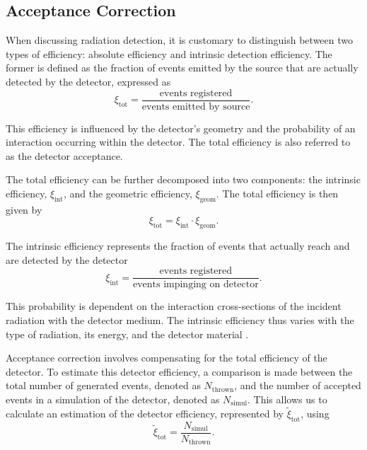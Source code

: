 \subsection{Acceptance Correction}
\label{ssec::acceptance_correction}
    When discussing radiation detection, it is customary to distinguish between two types of efficiency: absolute efficiency and intrinsic detection efficiency.
    The former is defined as the fraction of events emitted by the source that are actually detected by the detector, expressed as
    \begin{equation*}
        \xi_\text{tot} = \frac{\text{events registered}}{\text{events emitted by source}}.
    \end{equation*}

    This efficiency is influenced by the detector's geometry and the probability of an interaction occurring within the detector.
    The total efficiency is also referred to as the detector acceptance.

    The total efficiency can be further decomposed into two components: the intrinsic efficiency, $\xi_{\text{int}}$, and the geometric efficiency, $\xi_{\text{geom}}$.
    The total efficiency is then given by
    \begin{equation*}
        \xi_\text{tot} = \xi_\text{int} \cdot \xi_\text{geom}.
    \end{equation*}

    The intrinsic efficiency represents the fraction of events that actually reach and are detected by the detector
    \begin{equation*}
        \xi_\text{int} = \frac{\text{events registered}}{\text{events impinging on detector}}.
    \end{equation*}

    This probability is dependent on the interaction cross-sections of the incident radiation with the detector medium.
    The intrinsic efficiency thus varies with the type of radiation, its energy, and the detector material \cite{leo1987}.

    Acceptance correction involves compensating for the total efficiency of the detector.
    To estimate this detector efficiency, a comparison is made between the total number of generated events, denoted as $N_\text{thrown}$, and the number of accepted events in a simulation of the detector, denoted as $N_\text{simul}$.
    This allows us to calculate an estimation of the detector efficiency, represented by $\tilde\xi_\text{tot}$, using
    \begin{equation*}
        \tilde\xi_\text{tot} = \frac{N_\text{simul}}{N_\text{thrown}}.
    \end{equation*}

